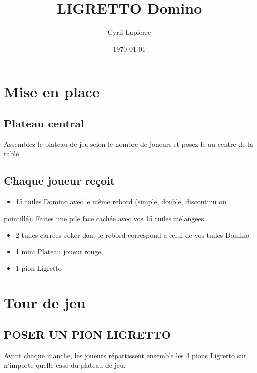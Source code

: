 \documentclass{article}%
\title{LIGRETTO Domino}%
\author{Cyril Lapierre}%
\date{\today}%
\begin{document}
%
\normalsize%
\maketitle\thispagestyle{header}%
\pagestyle{header}%
\section{ Mise en place
}%
\label{sec:Miseenplace}%

%
\subsection{ Plateau central
}%
\label{subsec:Plateaucentral}%
Assemblez le plateau de jeu selon le nombre de joueurs et posez{-}le au centre de la table


%
\subsection{ Chaque joueur reçoit
}%
\label{subsec:Chaquejoueurreoit}%
\begin{itemize}%
\item%
%
 15 tuiles Domino avec le même rebord (simple, double, discontinu ou
%
\end{itemize}%
pointillé). Faites une pile face cachée avec vos 15 tuiles mélangées.
%
\begin{itemize}%
\item%
%
 2 tuiles carrées Joker dont le rebord correspond à celui de vos tuiles Domino
%
\item%
%
 1 mini Plateau joueur rouge
%
\item%
%
 1 pion Ligretto
%
\end{itemize}

%
\section{ Tour de jeu
}%
\label{sec:Tourdejeu}%

%
\subsection{ POSER UN PION LIGRETTO
}%
\label{subsec:POSERUNPIONLIGRETTO}%
Avant chaque manche, les joueurs répartissent ensemble les 4 pions Ligretto sur n’importe quelle case du plateau de jeu.


%
\end{document}
